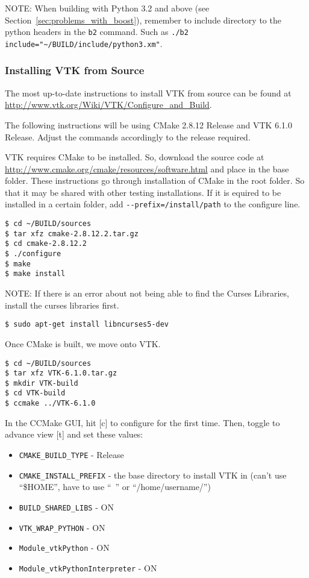 NOTE: When building with Python 3.2 and above (see Section~\ref{sec:problems_with_boost}), remember to include directory to the python headers in the \lstinline{b2} command. Such as \lstinline{./b2 include="~/BUILD/include/python3.xm"}.

\subsubsection{Installing VTK from Source}
\label{sub:installing_vtk_from_source}

The most up-to-date instructions to install VTK from source can be found at \url{http://www.vtk.org/Wiki/VTK/Configure_and_Build}.

The following instructions will be using CMake 2.8.12 Release and VTK 6.1.0 Release. Adjust the commands accordingly to the release required.

VTK requires CMake to be installed. So, download the source code at \url{http://www.cmake.org/cmake/resources/software.html} and place in the base folder. These instructions go through installation of CMake in the root folder. So that it may be shared with other testing installations. If it is equired to be installed in a certain folder, add \lstinline{--prefix=/install/path} to the configure line.

\begin{lstlisting}[style=inlineBash]
$ cd ~/BUILD/sources
$ tar xfz cmake-2.8.12.2.tar.gz
$ cd cmake-2.8.12.2
$ ./configure
$ make
$ make install
\end{lstlisting}

NOTE: If there is an error about not being able to find the Curses Libraries, install the curses libraries first.
\begin{lstlisting}[style=inlineBash]
$ sudo apt-get install libncurses5-dev
\end{lstlisting}

Once CMake is built, we move onto VTK.

\begin{lstlisting}[style=inlineBash]
$ cd ~/BUILD/sources
$ tar xfz VTK-6.1.0.tar.gz
$ mkdir VTK-build
$ cd VTK-build
$ ccmake ../VTK-6.1.0
\end{lstlisting}

In the CCMake GUI, hit [c] to configure for the first time. Then, toggle to advance view [t] and set these values:

\begin{itemize}[noitemsep,nolistsep]
	\item \lstinline{CMAKE_BUILD_TYPE} - Release
	\item \lstinline{CMAKE_INSTALL_PREFIX} - the base directory to install VTK in (can't use ``\$HOME'', have to use ``~'' or ``/home/username/'')
	\item \lstinline{BUILD_SHARED_LIBS} - ON
	\item \lstinline{VTK_WRAP_PYTHON} - ON
	\item \lstinline{Module_vtkPython} - ON
	\item \lstinline{Module_vtkPythonInterpreter} - ON
\end{itemize}

